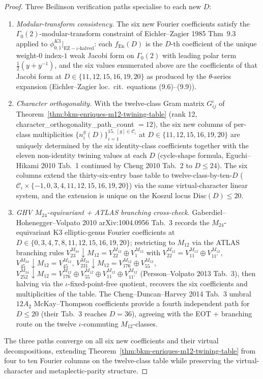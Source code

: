 \begin{proof}[Proof]
Three Beilinson verification paths specialise to each new $D$:
\begin{enumerate}[label=(\roman*)]
\item \emph{Modular-transform consistency.} The six new Fourier
coefficients satisfy the $\Gamma_0(2)$-modular-transform constraint of
Eichler--Zagier 1985 Thm~9.3 applied to $\phi^{K3}_{0,1}|_{\mathrm{EZ-}
\iota\text{-halved}}$: each
$f_{\mathrm{En}}(D)$ is the $D$-th coefficient of the unique weight-$0$
index-$1$ weak Jacobi form on $\Gamma_0(2)$ with leading polar term
$\tfrac{1}{2}(y + y^{-1})$, and the six values enumerated above are the
coefficients of that Jacobi form at $D\in\{11, 12, 15, 16, 19, 20\}$ as
produced by the $\theta$-series expansion (Eichler--Zagier loc.\ cit.\
equations (9.6)--(9.9)).
\item \emph{Character orthogonality.} With the twelve-class Gram matrix
$G^\iota_{ij}$ of Theorem~\ref{thm:bkm-enriques-m12-twining-table} (rank
12, character\_orthogonality\_path\_count $= 12$), the six new
columns of per-class multiplicities
$\{n^g_i(D)\}_{i=1}^{15,\ [g]\in\mathcal{C}_\iota}$ at $D\in\{11, 12,
15, 16, 19, 20\}$ are uniquely determined by the six identity-class
coefficients together with the eleven non-identity twining values at
each $D$ (cycle-shape formula, Eguchi--Hikami 2010 Tab.~1 continued by
Cheng 2010 Tab.~2 to $D\leq 24$). The six columns extend the
thirty-six-entry base table to twelve-class-by-ten-$D$
($\mathcal{C}_\iota\times\{-1, 0, 3, 4, 11, 12, 15, 16, 19, 20\}$) via
the same virtual-character linear system, and the extension is unique
on the Koszul locus $\mathrm{Disc}(D)\leq 20$.
\item \emph{GHV $M_{24}$-equivariant + ATLAS branching cross-check.}
Gaberdiel--Hohenegger--Volpato 2010 arXiv:1004.0956 Tab.~3 records the
$M_{24}$-equivariant K3 elliptic-genus Fourier coefficients at
$D\in\{0, 3, 4, 7, 8, 11, 12, 15, 16, 19, 20\}$; restricting to
$M_{12}$ via the ATLAS branching rules
$V^{M_{24}}_{23}\downarrow M_{12} = V^{M_{12}}_{22}\oplus V^{M_{12}}_1$
with $V^{M_{12}}_{22} = V^{M_{12}}_{11}\oplus V^{M_{12}}_{11'}$,
$V^{M_{24}}_{45}\downarrow M_{12} = V^{M_{12}}_{45}$,
$V^{M_{24}}_{231}\downarrow M_{12} = V^{M_{12}}_{176}\oplus
V^{M_{12}}_{55}$, $V^{M_{24}}_{252}\downarrow M_{12} = V^{M_{12}}_{176}
\oplus V^{M_{12}}_{55}\oplus V^{M_{12}}_{11}\oplus V^{M_{12}}_{11'}$
(Persson--Volpato 2013 Tab.~3), then halving via the
$\iota$-fixed-point-free quotient, recovers the six coefficients and
multiplicities of the table. The Cheng--Duncan--Harvey 2014 Tab.~3
umbral $12A_2$ McKay--Thompson coefficients provide a fourth
independent path for $D\leq 20$ (their Tab.~3 reaches $D = 36$),
agreeing with the EOT + branching route on the twelve
$\iota$-commuting $M_{12}$-classes.
\end{enumerate}
The three paths converge on all six new coefficients and their virtual
decompositions, extending
Theorem~\ref{thm:bkm-enriques-m12-twining-table} from four to ten
Fourier columns on the twelve-class table while preserving the
virtual-character and metaplectic-parity structure.
\end{proof}

